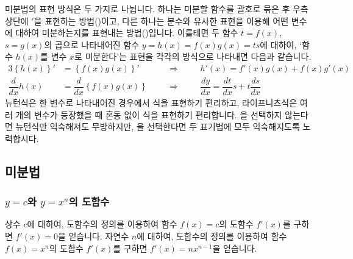 미분법의 표현 방식은 두 가지로 나뉩니다. 하나는 미분할 함수를 괄호로 묶은 후 우측 상단에 $'$을 표현하는 방법()이고, 다른 하나는 분수와 유사한 표현을 이용해 어떤 변수에 대하여 미분하는지를 표현내는 방법()입니다. 이를테면 두 함수 $t=f\left( x \right)$, $s=g\left( x \right)$의 곱으로 나타내어진 함수 $y =h\left( x \right) = f\left( x \right)g\left( x \right) =ts $에 대하여, `함수 $h\left( x \right)$를 변수 $x$로 미분한다'는 표현을 각각의 방식으로 나타내면 다음과 같습니다.
\begin{alignat*}{3}
\left\{ h\left( x \right) \right\}'
&= \left\{ f\left( x \right) g\left( x \right)  \right\}' &&\quad\Rightarrow
\quad&&h'\left( x \right)
= f'\left( x \right)g\left( x \right) + f\left( x \right) g'\left( x \right) \\
\dfrac{d}{dx} h\left( x \right) 
&=\dfrac{d}{dx} \left\{ f\left( x \right)g\left( x \right)  \right\}  &&\quad\Rightarrow
\quad&&\dfrac{dy}{dx}
=\dfrac{dt}{dx}s + t\dfrac{ds}{dx}
\end{alignat*}
뉴턴식은 한 변수로 나타내어진 경우에서 식을 표현하기 편리하고, 라이프니츠식은 여러 개의 변수가 등장했을 때 혼동 없이 식을 표현하기 편리합니다. 을 선택하지 않는다면 뉴턴식만 익숙해져도 무방하지만, 을 선택한다면 두 표기법에 모두 익숙해지도록 노력합시다.
\clearpage
\subsection{미분법}
\subsubsection{$y=c$와 $y=x^n$의 도함수}
상수 $c$에 대하여, 도함수의 정의를 이용하여 함수 $f\left( x \right) = c$의 도함수 $f'\left( x \right) $를 구하면 $f'\left( x \right) = 0$을 얻습니다.  자연수 $n$에 대하여, 도함수의 정의를 이용하여 함수 $f\left( x \right) = x^n$의 도함수 $f'\left( x \right) $를 구하면 $f'\left( x \right) = nx^{n-1}$을 얻습니다. 
